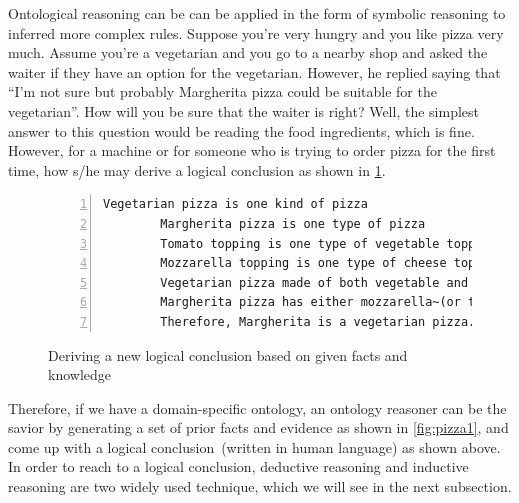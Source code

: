 \hspace*{3.5mm} Ontological reasoning can be can be applied in the form of symbolic reasoning to inferred more complex rules. Suppose you're very hungry and you like pizza very much. Assume you're a vegetarian and you go to a nearby shop and asked the waiter if they have an option for the vegetarian. However, he replied saying that ``I'm not sure but probably Margherita pizza could be suitable for the vegetarian''. How will you be sure that the waiter is right? Well, the simplest answer to this question would be reading the food ingredients, which is fine. However, for a machine or for someone who is trying to order pizza for the first time, how s/he may derive a logical conclusion as shown in \cref{fig:sparqlEx1}.  


\begin{figure}[h]
    \centering
    \small
    \begin{Verbatim}[frame=single,numbers=left]
        Vegetarian pizza is one kind of pizza 
        Margherita pizza is one type of pizza
        Tomato topping is one type of vegetable topping
        Mozzarella topping is one type of cheese topping
        Vegetarian pizza made of both vegetable and cheese topping
        Margherita pizza has either mozzarella~(or tomato) topping or both
        Therefore, Margherita is a vegetarian pizza.
    \end{Verbatim}
    \vspace{-3mm}
    \caption{Deriving a new logical conclusion based on given facts and knowledge}
    \label{fig:sparqlEx1}
\end{figure}

\hspace*{3.5mm} Therefore, if we have a domain-specific ontology, an ontology reasoner can be the savior by generating a set of prior facts and evidence as shown in \cref{fig:pizza1}, and come up with a logical conclusion~(written in human language) as shown above. In order to reach to a logical conclusion, deductive reasoning and inductive reasoning are two widely used technique, which we will see in the next subsection. 

